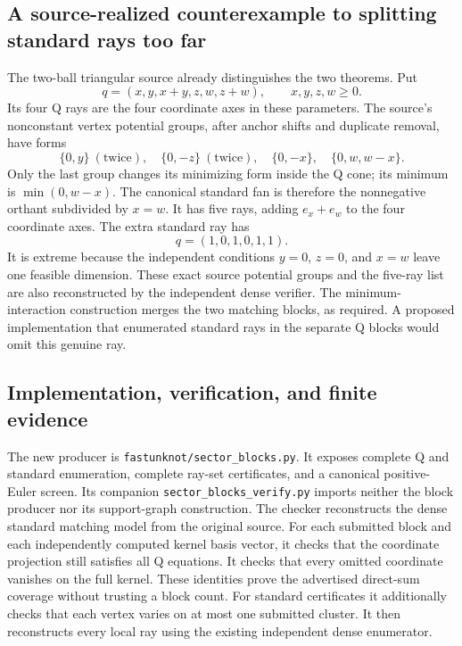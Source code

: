 \subsection{A source-realized counterexample to splitting standard rays too far}

The two-ball triangular source already distinguishes the two theorems.
Put
\[
             q=(x,y,x+y,z,w,z+w),\qquad x,y,z,w\geq0.
\]
Its four Q rays are the four coordinate axes in these parameters.
The source's nonconstant vertex potential groups, after anchor shifts and
duplicate removal, have forms
\[
 \{0,y\}\ (\text{twice}),\quad \{0,-z\}\ (\text{twice}),
 \quad\{0,-x\},\quad\{0,w,w-x\}.
\]
Only the last group changes its minimizing form inside the Q cone; its
minimum is $\min(0,w-x)$.  The canonical standard fan is therefore the
nonnegative orthant subdivided by $x=w$.  It has five rays, adding
$e_x+e_w$ to the four coordinate axes.  The extra standard ray has
\[
                         q=(1,0,1,0,1,1).
\]
It is extreme because the independent conditions $y=0$, $z=0$, and $x=w$
leave one feasible dimension.  These exact source potential groups and the
five-ray list are also reconstructed by the independent dense verifier.
The minimum-interaction construction merges the two matching blocks, as
required.  A proposed implementation that enumerated standard rays in
the separate Q blocks would omit this genuine ray.

\subsection{Implementation, verification, and finite evidence}

The new producer is \texttt{fastunknot/sector\_blocks.py}.  It exposes
complete Q and standard enumeration, complete ray-set certificates, and a
canonical positive-Euler screen.  Its companion
\texttt{sector\_blocks\_verify.py} imports neither the block producer nor
its support-graph construction.  The checker reconstructs the dense
standard matching model from the original source.  For each submitted
block and each independently computed kernel basis vector, it checks that
the coordinate projection still satisfies all Q equations.  It checks
that every omitted coordinate vanishes on the full kernel.  These identities
prove the advertised direct-sum coverage without trusting a block count.
For standard certificates it additionally checks that each vertex varies
on at most one submitted cluster.  It then reconstructs every local ray
using the existing independent dense enumerator.

